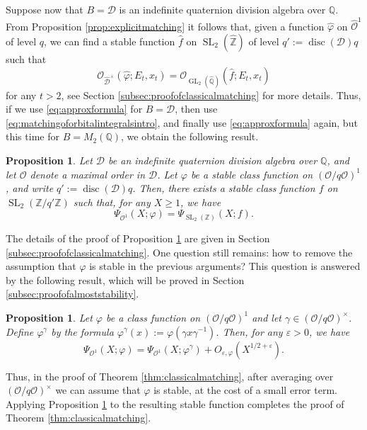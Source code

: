 \documentclass{article}
\newtheorem{prop}[lem]{Proposition}
\theoremstyle{named}
\newcommand{\D}{\mathcal{D}}
\newcommand{\Z}{\mathbb{Z}}
\newcommand{\Q}{\mathbb{Q}}
\renewcommand{\O}{\mathcal{O}}
\DeclareMathOperator{\SL}{SL}
\DeclareMathOperator{\GL}{GL}
\DeclareMathOperator{\disc}{disc}
\begin{document}
Suppose now that $B = \D$ is an indefinite quaternion division algebra over $\Q$. From Proposition \ref{prop:explicitmatching} it follows that, given a function $\widehat{\varphi}$ on $\widehat{\O}^1$ of level $q$, we can find a stable function $\widehat{f}$ on $\SL_2(\widehat{\Z})$ of level $q' :=\disc(\D) q$ such that 
\begin{equation}\label{eq:matchingoforbitalintegralsintro}
    \O_{\widehat{\D}^\times}(\widehat{\varphi}; E_t, x_t) = \O_{\GL_2(\widehat{\Q})}(\widehat{f}; E_t, x_t)
\end{equation}
for any $t > 2$, see Section \ref{subsec:proofofclassicalmatching} for more details. Thus, if we use \eqref{eq:approxformula} for $B = \D$, then use \eqref{eq:matchingoforbitalintegralsintro}, and finally use \eqref{eq:approxformula} again, but this time for $B = M_2(\Q)$, we obtain the following result.

\begin{prop}\label{prop:classicalmatchingforstable}
Let $\D$ be an indefinite quaternion division algebra over $\Q$, and let $\O$ denote a maximal order in $\D$. Let $\varphi$ be a stable class function on $(\O/q\O)^1$, and write $q' := \disc(\D) q$. Then, there exists a stable class function $f$ on $\SL_2(\Z/q'\Z)$ such that, for any $X \geq 1$, we have
\begin{equation*}
    \Psi_{\O^1}(X; \varphi) = \Psi_{\SL_2(\Z)}(X; f).
\end{equation*}
\end{prop}
The details of the proof of Proposition \ref{prop:classicalmatchingforstable} are given in Section \ref{subsec:proofofclassicalmatching}. One question still remains: how to remove the assumption that $\varphi$ is stable in the previous arguments? This question is answered by the following result, which will be proved in Section \ref{subsec:proofofalmoststability}.
\begin{prop}\label{prop:almoststabilityclassical}
Let $\varphi$ be a class function on $(\O/q\O)^1$ and let $\gamma \in (\O/q\O)^\times$. Define $\varphi^\gamma$ by the formula $\varphi^\gamma(x) := \varphi(\gamma x \gamma^{-1})$. Then, for any $\varepsilon > 0$, we have 
\begin{equation*}
    \Psi_{\O^1}(X; \varphi) = \Psi_{\O^1}(X; \varphi^\gamma) + O_{\varepsilon, \varphi}(X^{1/2 + \varepsilon}).
\end{equation*}
\end{prop}
Thus, in the proof of Theorem \ref{thm:classicalmatching}, after averaging over $(\O/q\O)^\times$ we can assume that $\varphi$ is stable, at the cost of a small error term. Applying Proposition \ref{prop:classicalmatchingforstable} to the resulting stable function completes the proof of Theorem \ref{thm:classicalmatching}.
\end{document}

